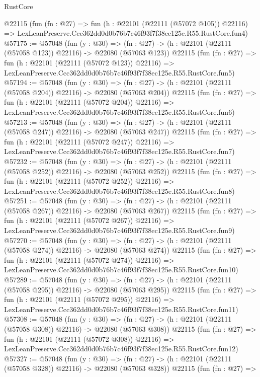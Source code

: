 \begin{lexlean}{RustCore}
\begin{coremodule}
    @22115
    (fun (fn : @27) =>
    fun (h : @22101 (@22111 (@57072 @105)) @22116) =>
    LexLeanPreserve.Ccc362dd0d0b76b7c46f93f7f38ec125e.R55.RustCore.fun4)
@57175 := @57048
    (fun (y : @30) =>
    (fn : @27) -> (h : @22101 (@22111 (@57058 @123)) @22116) -> @22080 (@57063 @123))
    @22115
    (fun (fn : @27) =>
    fun (h : @22101 (@22111 (@57072 @123)) @22116) =>
    LexLeanPreserve.Ccc362dd0d0b76b7c46f93f7f38ec125e.R55.RustCore.fun5)
@57194 := @57048
    (fun (y : @30) =>
    (fn : @27) -> (h : @22101 (@22111 (@57058 @204)) @22116) -> @22080 (@57063 @204))
    @22115
    (fun (fn : @27) =>
    fun (h : @22101 (@22111 (@57072 @204)) @22116) =>
    LexLeanPreserve.Ccc362dd0d0b76b7c46f93f7f38ec125e.R55.RustCore.fun6)
@57213 := @57048
    (fun (y : @30) =>
    (fn : @27) -> (h : @22101 (@22111 (@57058 @247)) @22116) -> @22080 (@57063 @247))
    @22115
    (fun (fn : @27) =>
    fun (h : @22101 (@22111 (@57072 @247)) @22116) =>
    LexLeanPreserve.Ccc362dd0d0b76b7c46f93f7f38ec125e.R55.RustCore.fun7)
@57232 := @57048
    (fun (y : @30) =>
    (fn : @27) -> (h : @22101 (@22111 (@57058 @252)) @22116) -> @22080 (@57063 @252))
    @22115
    (fun (fn : @27) =>
    fun (h : @22101 (@22111 (@57072 @252)) @22116) =>
    LexLeanPreserve.Ccc362dd0d0b76b7c46f93f7f38ec125e.R55.RustCore.fun8)
@57251 := @57048
    (fun (y : @30) =>
    (fn : @27) -> (h : @22101 (@22111 (@57058 @267)) @22116) -> @22080 (@57063 @267))
    @22115
    (fun (fn : @27) =>
    fun (h : @22101 (@22111 (@57072 @267)) @22116) =>
    LexLeanPreserve.Ccc362dd0d0b76b7c46f93f7f38ec125e.R55.RustCore.fun9)
@57270 := @57048
    (fun (y : @30) =>
    (fn : @27) -> (h : @22101 (@22111 (@57058 @274)) @22116) -> @22080 (@57063 @274))
    @22115
    (fun (fn : @27) =>
    fun (h : @22101 (@22111 (@57072 @274)) @22116) =>
    LexLeanPreserve.Ccc362dd0d0b76b7c46f93f7f38ec125e.R55.RustCore.fun10)
@57289 := @57048
    (fun (y : @30) =>
    (fn : @27) -> (h : @22101 (@22111 (@57058 @295)) @22116) -> @22080 (@57063 @295))
    @22115
    (fun (fn : @27) =>
    fun (h : @22101 (@22111 (@57072 @295)) @22116) =>
    LexLeanPreserve.Ccc362dd0d0b76b7c46f93f7f38ec125e.R55.RustCore.fun11)
@57308 := @57048
    (fun (y : @30) =>
    (fn : @27) -> (h : @22101 (@22111 (@57058 @308)) @22116) -> @22080 (@57063 @308))
    @22115
    (fun (fn : @27) =>
    fun (h : @22101 (@22111 (@57072 @308)) @22116) =>
    LexLeanPreserve.Ccc362dd0d0b76b7c46f93f7f38ec125e.R55.RustCore.fun12)
@57327 := @57048
    (fun (y : @30) =>
    (fn : @27) -> (h : @22101 (@22111 (@57058 @328)) @22116) -> @22080 (@57063 @328))
    @22115
    (fun (fn : @27) =>

\end{coremodule}
\end{lexlean}
